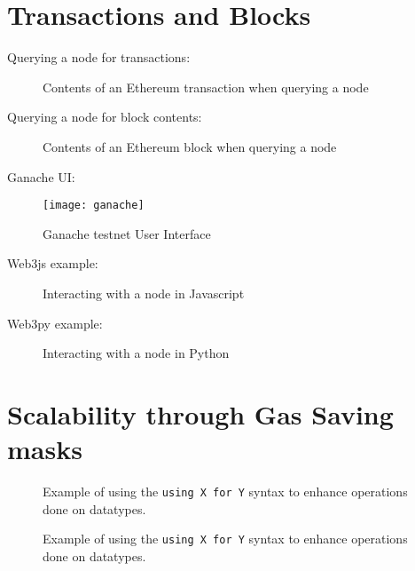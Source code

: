 \begin{appendices}

\chapter{Transactions and Blocks}
Querying a node for transactions:
\begin{figure}[H]
    \centering
    
    \caption{Contents of an Ethereum transaction when querying a node}
    \label{fig:transaction}
\end{figure}

Querying a node for block contents:
\begin{figure}[H]
    \centering
    
    \caption{Contents of an Ethereum block when querying a node}
    \label{fig:block}
\end{figure}

Ganache UI:
\begin{figure}[H]
    \centering
    \texttt{[image: ganache]}
    \caption{Ganache testnet User Interface}
    \label{fig:ganache}
    
\end{figure}

Web3js example:
\begin{figure}[H]
    \centering
    
    \caption{Interacting with a node in Javascript}
    \label{fig:web3js}
\end{figure}

Web3py example:
\begin{figure}[H]
    \centering
    
    \caption{Interacting with a node in Python}
    \label{fig:web3py}
\end{figure}

\chapter{Scalability through Gas Saving masks} \label{apx:scalability}

\begin{figure}[ht!]
    \centering
    
    \caption{Example of using the \texttt{using X for Y} syntax to enhance operations done on datatypes.}
    \label{fig:library}
\end{figure}


\begin{figure}[ht!]
    \centering
    
    \caption{Example of using the \texttt{using X for Y} syntax to enhance operations done on datatypes.}
    \label{apx:scalability:overflow}
\end{figure}


\end{appendices}
